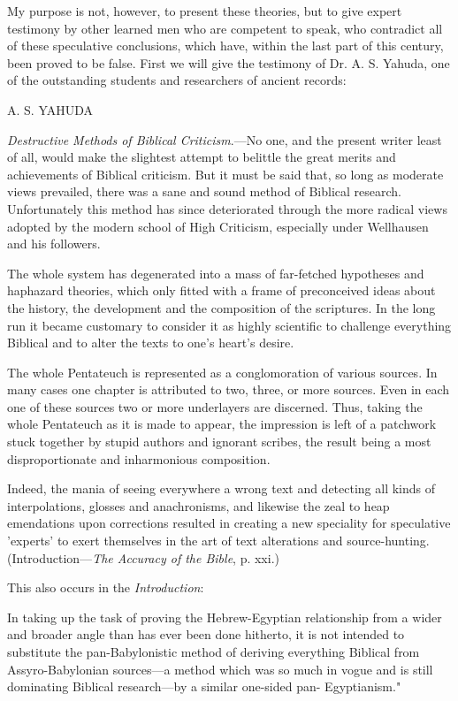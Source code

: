 My purpose is not, however, to present these theories, but to give expert testimony by other
learned men who are competent to speak, who contradict all of these speculative conclusions,
which have, within the last part of this century, been proved to be false. First we will give the
testimony of Dr. A. S. Yahuda, one of the outstanding students and researchers of ancient
records:

A. S. YAHUDA

\textit{Destructive Methods of Biblical Criticism}.—No one, and the present writer least of all, would
make the slightest attempt to belittle the great merits and achievements of Biblical criticism.
But it must be said that, so long as moderate views prevailed, there was a sane and sound
method of Biblical research. Unfortunately this method has since deteriorated through the
more radical views adopted by the modern school of High Criticism, especially under
Wellhausen and his followers.

The whole system has degenerated into a mass of far-fetched hypotheses and haphazard
theories, which only fitted with a frame of preconceived ideas about the history, the
development and the composition of the scriptures. In the long run it became customary to
consider it as highly scientific to challenge everything Biblical and to alter the texts to one's
heart's desire.

The whole Pentateuch is represented as a conglomoration of various sources. In many cases
one chapter is attributed to two, three, or more sources. Even in each one of these sources
two or more underlayers are discerned. Thus, taking the whole Pentateuch as it is made to
appear, the impression is left of a patchwork stuck together by stupid authors and ignorant
scribes, the result being a most disproportionate and inharmonious composition.

Indeed, the mania of seeing everywhere a wrong text and detecting all kinds of
interpolations, glosses and anachronisms, and likewise the zeal to heap emendations upon
corrections resulted in creating a new speciality for speculative 'experts' to exert themselves
in the art of text alterations and source-hunting. (Introduction—\textit{The Accuracy of the Bible}, p.
xxi.)

This also occurs in the \textit{Introduction}:

In taking up the task of proving the Hebrew-Egyptian relationship from a wider and broader
angle than has ever been done hitherto, it is not intended to substitute the pan-Babylonistic
method of deriving everything Biblical from Assyro-Babylonian sources—a method which
was so much in vogue and is still dominating Biblical research—by a similar one-sided pan-
Egyptianism."

